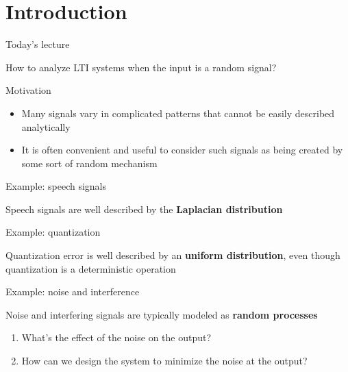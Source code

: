 \documentclass[10pt]{beamer}
\begin{document}
\section{Introduction}
\begin{frame}{Today's lecture} 

How to analyze LTI systems when the input is a random signal?

\begin{block}{Motivation}
	\begin{itemize}
		\item Many signals vary in complicated patterns that
		cannot be easily described analytically
		\item It is often convenient and useful to consider
		such signals as being created by some sort of
		random mechanism
	\end{itemize}   	
\end{block}
\end{frame}

%
\begin{frame}{Example: speech signals}

Speech signals are well described by the \textbf{Laplacian distribution}

\begin{figure}
	\centering
	\resizebox{\linewidth}{!}{}
	\label{fig:speech_and_dist}
\end{figure} 

\end{frame}


%
\begin{frame}{Example: quantization}

Quantization error is well described by an \textbf{uniform distribution}, even though quantization is a deterministic operation 
\vspace{-0.6cm}
\begin{center}
	\resizebox{\linewidth}{!}{}
\end{center}


\end{frame}

%
\begin{frame}{Example: noise and interference}

Noise and interfering signals are typically modeled as \textbf{random processes}

\begin{enumerate}
	\item What's the effect of the noise on the output? 
	\item How can we design the system to minimize the noise at the output?	
\end{enumerate}

\begin{figure}
	\centering
	\resizebox{\linewidth}{!}{}
\end{figure} 
\end{frame}
\end{document}

